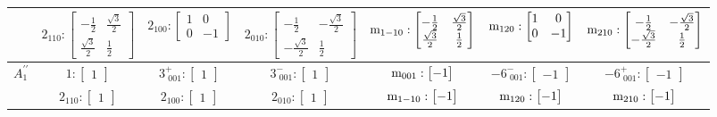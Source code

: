 \documentclass[fleqn,8pt,landscape]{jsarticle}
\begin{document}
\begin{longtable}{ccccccc}
& $ 2{}_{110}:\begin{bmatrix} - \frac{1}{2} & \frac{\sqrt{3}}{2} \\ \frac{\sqrt{3}}{2} & \frac{1}{2} \end{bmatrix} $ & $ 2{}_{100}:\begin{bmatrix} 1 & 0 \\ 0 & -1 \end{bmatrix} $ & $ 2{}_{010}:\begin{bmatrix} - \frac{1}{2} & - \frac{\sqrt{3}}{2} \\ - \frac{\sqrt{3}}{2} & \frac{1}{2} \end{bmatrix} $ & $ {\rm m}_{1-10}:\begin{bmatrix} - \frac{1}{2} & \frac{\sqrt{3}}{2} \\ \frac{\sqrt{3}}{2} & \frac{1}{2} \end{bmatrix} $ & $ {\rm m}_{120}:\begin{bmatrix} 1 & 0 \\ 0 & -1 \end{bmatrix} $ & $ {\rm m}_{210}:\begin{bmatrix} - \frac{1}{2} & - \frac{\sqrt{3}}{2} \\ - \frac{\sqrt{3}}{2} & \frac{1}{2} \end{bmatrix} $ \\ \hline
$ A_{1}^{\prime\prime} $ & $ 1:\begin{bmatrix} 1 \end{bmatrix} $ & $ 3^{+}_{\,\,001}:\begin{bmatrix} 1 \end{bmatrix} $ & $ 3^{-}_{\,\,001}:\begin{bmatrix} 1 \end{bmatrix} $ & $ {\rm m}_{001}:\begin{bmatrix} -1 \end{bmatrix} $ & $ -6^{-}_{\,\,001}:\begin{bmatrix} -1 \end{bmatrix} $ & $ -6^{+}_{\,\,001}:\begin{bmatrix} -1 \end{bmatrix} $ \\
& $ 2{}_{110}:\begin{bmatrix} 1 \end{bmatrix} $ & $ 2{}_{100}:\begin{bmatrix} 1 \end{bmatrix} $ & $ 2{}_{010}:\begin{bmatrix} 1 \end{bmatrix} $ & $ {\rm m}_{1-10}:\begin{bmatrix} -1 \end{bmatrix} $ & $ {\rm m}_{120}:\begin{bmatrix} -1 \end{bmatrix} $ & $ {\rm m}_{210}:\begin{bmatrix} -1 \end{bmatrix} $ \\ \hline

\end{longtable}
\end{document}
